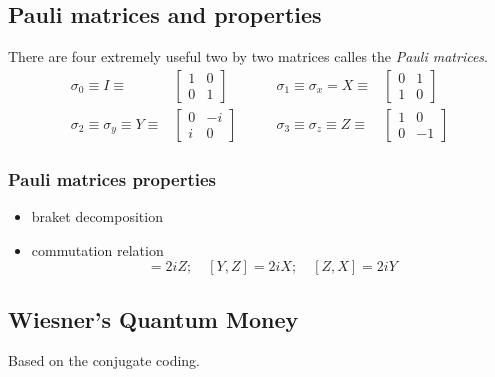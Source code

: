 \documentclass{article}
\begin{document}
\subsection{Pauli matrices and properties}
There are four extremely useful two by two matrices calles the \textit{Pauli matrices}.
$$
\begin{aligned}
    \sigma_0 \equiv I \equiv &
        \begin{bmatrix}
            1 & 0 \\ 0 & 1
        \end{bmatrix}
    \quad & \quad
    \sigma_1 \equiv \sigma_x = X \equiv &
        \begin{bmatrix}
            0 & 1 \\ 1 & 0
        \end{bmatrix}
    \\
    \sigma_2 \equiv \sigma_y \equiv Y \equiv &
        \begin{bmatrix}
            0 & -i \\ i & 0
        \end{bmatrix}
    \quad & \quad
    \sigma_3 \equiv \sigma_z \equiv Z \equiv &
        \begin{bmatrix}
            1 & 0 \\ 0 & -1
        \end{bmatrix}
\end{aligned}
$$

\subsubsection*{Pauli matrices properties}
\begin{itemize}[label=-]
    \item braket decomposition
    \item commutation relation %
        \begin{equation}
            [X,Y] = 2iZ; \quad [Y, Z] = 2iX; \quad [Z,X] = 2iY
        \end{equation}
\end{itemize}

\subsection{Wiesner's Quantum Money}
Based on the conjugate coding.
\end{document}
